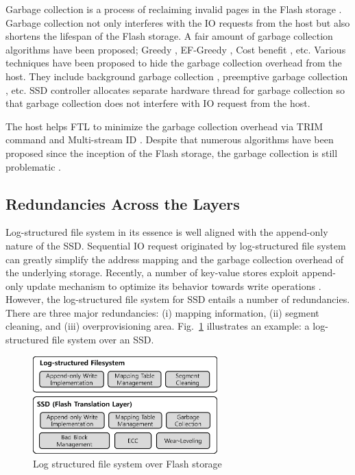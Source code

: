 \documentclass[prodmode,acmtecs]{acmsmall}
\begin{document}
Garbage collection is a process of reclaiming invalid pages in the
Flash storage \cite{agrawal2008design}. Garbage collection not only
interferes with the IO requests from the host but also shortens the
lifespan of the Flash storage. A fair amount of garbage collection
algorithms have been proposed; Greedy \cite{kawaguchi1995Flash},
EF-Greedy \cite{kwon2007ef}, Cost benefit \cite{rosenblum1992design},
etc.  Various techniques have been proposed to hide the garbage
collection overhead from the host. They include background garbage
collection \cite{smith2011garbage}, preemptive garbage collection
\cite{lee2011semi}, etc. SSD controller allocates separate
hardware thread for garbage collection so that garbage collection does
not interfere with IO request from the host.

The host helps FTL to minimize the garbage collection overhead via TRIM command
\cite{shu2007data} and Multi-stream ID \cite{kang2014multi}. Despite
that numerous algorithms have been proposed since the inception of the
Flash storage, the garbage collection is still problematic
\cite{zheng2015optimize,yang2015optimality}.



\subsection{Redundancies Across the Layers}
\label{subsec:stack_logs}

Log-structured file system in its essence is well aligned with the
append-only nature of the SSD. Sequential IO request originated by
log-structured file system can greatly simplify the address mapping
and the garbage collection overhead of the underlying storage.
Recently, a number of key-value stores exploit append-only update
mechanism to optimize its behavior towards write operations
\cite{lim2011silt,ghemawat2014leveldb}.  However, the log-structured
file system for SSD entails a number of redundancies. There are
three major redundancies:  (i)  mapping information,  (ii)  segment
cleaning, and  (iii)  overprovisioning area.
Fig.~\ref{fig:layered_log_system} illustrates an example: a
log-structured file system over an SSD.

\begin{figure}[t]
\begin{center}
\includegraphics[width=2.8in]{./figure/layered_log_system}
\caption{Log structured file system over Flash storage}
\label{fig:layered_log_system}
\end{center}
\end{figure}
\end{document}
